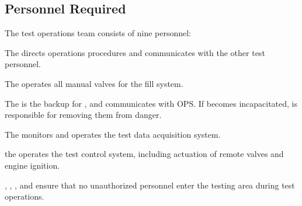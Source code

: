 \subsection{Personnel Required}
The test operations team consists of nine personnel:
\begin{checklist}
    \item The \opsfull{} directs operations procedures and communicates with the other test personnel.
    \item The \primaryfull{} operates all manual valves for the fill system.
    \item The \secondaryfull{} is the backup for \primary{}, and communicates with OPS. If \primary{} becomes incapacitated, \secondary{} is responsible for removing them from danger.
    \item The \daqfull{} monitors and operates the test data acquisition system.
    \item the \controlfull{} operates the test control system, including actuation of remote valves and engine ignition.
    \item \perifull{}, \periifull{}, \periiifull{}, and \perivfull{} ensure that no unauthorized personnel enter the testing area during test operations.
\end{checklist}
\setcounter{checklistnum}{0}

